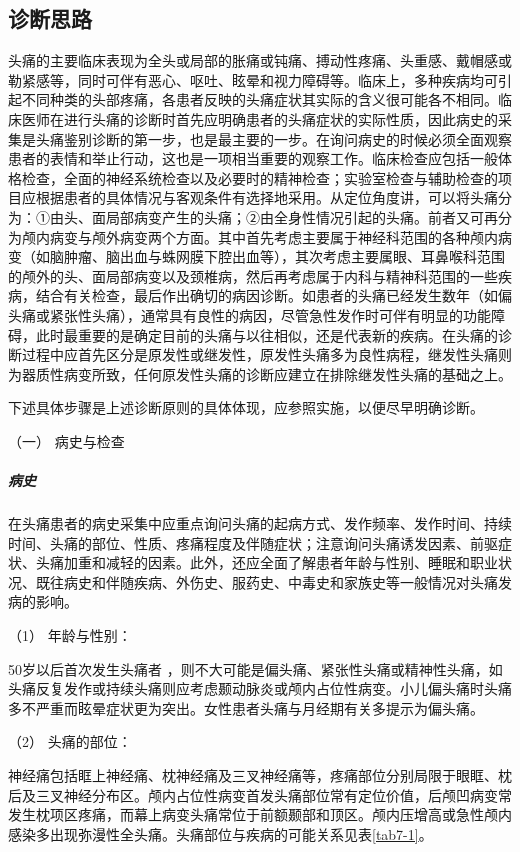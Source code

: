 \subsection{诊断思路}

头痛的主要临床表现为全头或局部的胀痛或钝痛、搏动性疼痛、头重感、戴帽感或勒紧感等，同时可伴有恶心、呕吐、眩晕和视力障碍等。临床上，多种疾病均可引起不同种类的头部疼痛，各患者反映的头痛症状其实际的含义很可能各不相同。临床医师在进行头痛的诊断时首先应明确患者的头痛症状的实际性质，因此病史的采集是头痛鉴别诊断的第一步，也是最主要的一步。在询问病史的时候必须全面观察患者的表情和举止行动，这也是一项相当重要的观察工作。临床检查应包括一般体格检查，全面的神经系统检查以及必要时的精神检查；实验室检查与辅助检查的项目应根据患者的具体情况与客观条件有选择地采用。从定位角度讲，可以将头痛分为：①由头、面局部病变产生的头痛；②由全身性情况引起的头痛。前者又可再分为颅内病变与颅外病变两个方面。其中首先考虑主要属于神经科范围的各种颅内病变（如脑肿瘤、脑出血与蛛网膜下腔出血等），其次考虑主要属眼、耳鼻喉科范围的颅外的头、面局部病变以及颈椎病，然后再考虑属于内科与精神科范围的一些疾病，结合有关检查，最后作出确切的病因诊断。如患者的头痛已经发生数年（如偏头痛或紧张性头痛），通常具有良性的病因，尽管急性发作时可伴有明显的功能障碍，此时最重要的是确定目前的头痛与以往相似，还是代表新的疾病。在头痛的诊断过程中应首先区分是原发性或继发性，原发性头痛多为良性病程，继发性头痛则为器质性病变所致，任何原发性头痛的诊断应建立在排除继发性头痛的基础之上。

下述具体步骤是上述诊断原则的具体体现，应参照实施，以便尽早明确诊断。

\hypertarget{text00020.htmlux5cux23CHP1-7-2-1}{}
（一） 病史与检查

\subparagraph{病史}

在头痛患者的病史采集中应重点询问头痛的起病方式、发作频率、发作时间、持续时间、头痛的部位、性质、疼痛程度及伴随症状；注意询问头痛诱发因素、前驱症状、头痛加重和减轻的因素。此外，还应全面了解患者年龄与性别、睡眠和职业状况、既往病史和伴随疾病、外伤史、服药史、中毒史和家族史等一般情况对头痛发病的影响。

\hypertarget{text00020.htmlux5cux23CHP1-7-2-1-1-1}{}
（1） 年龄与性别：

50岁以后首次发生头痛者
，则不大可能是偏头痛、紧张性头痛或精神性头痛，如头痛反复发作或持续头痛则应考虑颞动脉炎或颅内占位性病变。小儿偏头痛时头痛多不严重而眩晕症状更为突出。女性患者头痛与月经期有关多提示为偏头痛。

\hypertarget{text00020.htmlux5cux23CHP1-7-2-1-1-2}{}
（2） 头痛的部位：

神经痛包括眶上神经痛、枕神经痛及三叉神经痛等，疼痛部位分别局限于眼眶、枕后及三叉神经分布区。颅内占位性病变首发头痛部位常有定位价值，后颅凹病变常发生枕项区疼痛，而幕上病变头痛常位于前额颞部和顶区。颅内压增高或急性颅内感染多出现弥漫性全头痛。头痛部位与疾病的可能关系见表\ref{tab7-1}。

